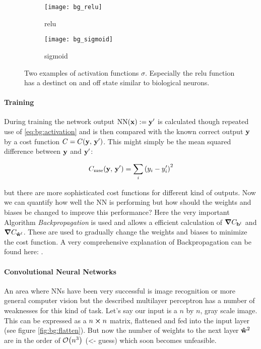 \begin{figure}[H]
\centering
\begin{subfigure}{.5\textwidth}
    \centering
    \texttt{[image: bg\_relu]}
    \caption{relu}
    \label{}
\end{subfigure}%
\begin{subfigure}{.5\textwidth}
    \centering
    \texttt{[image: bg\_sigmoid]}
    \caption{sigmoid}
    \label{}
\end{subfigure}
\caption{Two examples of activation functions $\sigma$. Especially the relu function has a destinct on and off state similar to biological neurons.}
\label{}
\end{figure}

\paragraph{Training}
During training the network output $\mathrm{NN}(\vb x) := \vb{y}' $ is calculated though repeated use of \eqref{eq:bg:activation} and is then compared with the known correct output $\vb y$ by a cost function $C = C(\vb y, \, \vb y')$. This might simply be the mean squared difference between $\vb y$ and $\vb y'$:

\begin{equation}
    C_{\mathrm{mse}}(\vb y, \, \vb y') = \sum_i \qty(y_i - y_i')^2
\end{equation}

\noindent
but there are more sophisticated cost functions for different kind of outputs. Now we can quantify how well the NN is performing but how should the weights and biases be changed to improve this performance?
Here the very important Algorithm \textit{Backpropagation} is used and allows a efficient calculation of $\grad{C}_{\vb{b}^l}$ and $\grad{C}_{\vu{w}^l}$. These are used to gradually change the weights and biases to minimize the cost function. A very comprehensive explanation of Backpropagation can be found here: \cite{backprop}.

\paragraph{Convolutional Neural Networks}
An area where NNs have been very successful is image recognition or more general computer vision but the described multilayer perceptron has a number of weaknesses for this kind of task. Let's say our input is a $n$ by $n$, gray scale image. This can be expressed as a $n \cp n$ matrix, flattened and fed into the input layer (see figure \ref{fig:bg:flatten}). But now the number of weights to the next layer $\vu{w}^2$ are in the order of
$\order{n^3}$ (<- guess)
which soon becomes unfeasible.

